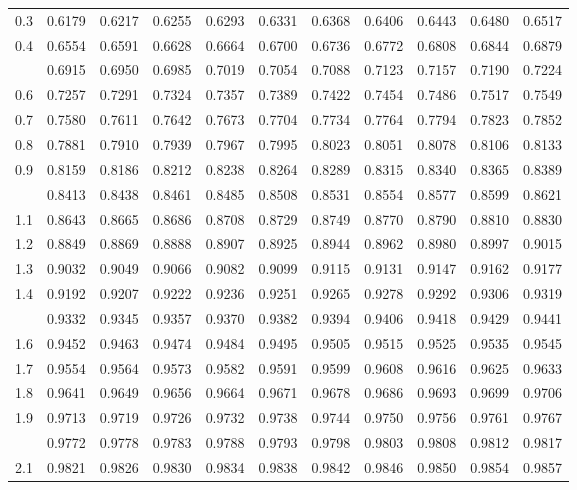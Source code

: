 \documentclass[12pt,a4paper]{article}
\begin{document}
\begin{enumerate}
\begin{center}
\begin{longtable}{ccccccccccc}
0.3 & 0.6179 & 0.6217 & 0.6255 & 0.6293 & 0.6331 & 0.6368 & 0.6406 & 0.6443 & 0.6480 & 0.6517 \\
0.4 & 0.6554 & 0.6591 & 0.6628 & 0.6664 & 0.6700 & 0.6736 & 0.6772 & 0.6808 & 0.6844 & 0.6879 \\
\addlinespace
0.5 & 0.6915 & 0.6950 & 0.6985 & 0.7019 & 0.7054 & 0.7088 & 0.7123 & 0.7157 & 0.7190 & 0.7224 \\
0.6 & 0.7257 & 0.7291 & 0.7324 & 0.7357 & 0.7389 & 0.7422 & 0.7454 & 0.7486 & 0.7517 & 0.7549 \\
0.7 & 0.7580 & 0.7611 & 0.7642 & 0.7673 & 0.7704 & 0.7734 & 0.7764 & 0.7794 & 0.7823 & 0.7852 \\
0.8 & 0.7881 & 0.7910 & 0.7939 & 0.7967 & 0.7995 & 0.8023 & 0.8051 & 0.8078 & 0.8106 & 0.8133 \\
0.9 & 0.8159 & 0.8186 & 0.8212 & 0.8238 & 0.8264 & 0.8289 & 0.8315 & 0.8340 & 0.8365 & 0.8389 \\
\addlinespace
1.0 & 0.8413 & 0.8438 & 0.8461 & 0.8485 & 0.8508 & 0.8531 & 0.8554 & 0.8577 & 0.8599 & 0.8621 \\
1.1 & 0.8643 & 0.8665 & 0.8686 & 0.8708 & 0.8729 & 0.8749 & 0.8770 & 0.8790 & 0.8810 & 0.8830 \\
1.2 & 0.8849 & 0.8869 & 0.8888 & 0.8907 & 0.8925 & 0.8944 & 0.8962 & 0.8980 & 0.8997 & 0.9015 \\
1.3 & 0.9032 & 0.9049 & 0.9066 & 0.9082 & 0.9099 & 0.9115 & 0.9131 & 0.9147 & 0.9162 & 0.9177 \\
1.4 & 0.9192 & 0.9207 & 0.9222 & 0.9236 & 0.9251 & 0.9265 & 0.9278 & 0.9292 & 0.9306 & 0.9319 \\
\addlinespace
1.5 & 0.9332 & 0.9345 & 0.9357 & 0.9370 & 0.9382 & 0.9394 & 0.9406 & 0.9418 & 0.9429 & 0.9441 \\
1.6 & 0.9452 & 0.9463 & 0.9474 & 0.9484 & 0.9495 & 0.9505 & 0.9515 & 0.9525 & 0.9535 & 0.9545 \\
1.7 & 0.9554 & 0.9564 & 0.9573 & 0.9582 & 0.9591 & 0.9599 & 0.9608 & 0.9616 & 0.9625 & 0.9633 \\
1.8 & 0.9641 & 0.9649 & 0.9656 & 0.9664 & 0.9671 & 0.9678 & 0.9686 & 0.9693 & 0.9699 & 0.9706 \\
1.9 & 0.9713 & 0.9719 & 0.9726 & 0.9732 & 0.9738 & 0.9744 & 0.9750 & 0.9756 & 0.9761 & 0.9767 \\
\addlinespace
2.0 & 0.9772 & 0.9778 & 0.9783 & 0.9788 & 0.9793 & 0.9798 & 0.9803 & 0.9808 & 0.9812 & 0.9817 \\
2.1 & 0.9821 & 0.9826 & 0.9830 & 0.9834 & 0.9838 & 0.9842 & 0.9846 & 0.9850 & 0.9854 & 0.9857 \\

\end{longtable}
\end{center}
\end{enumerate}
\end{document}
